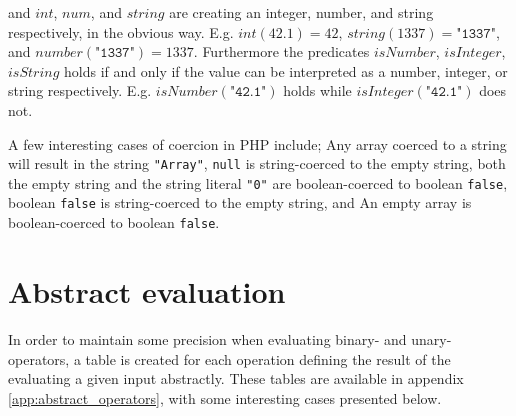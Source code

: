 and $\mathit{int}$, $\mathit{num}$, and $\mathit{string}$ are creating an integer, number, and string respectively, in the obvious way. E.g. $\mathit{int}(42.1) = 42$, $\mathit{string}(1337) = \texttt{"1337"}$, and $\mathit{number}(\texttt{"1337"}) = 1337$. Furthermore the predicates $\mathit{isNumber}$, $\mathit{isInteger}$, $\mathit{isString}$ holds if and only if the value can be interpreted as a number, integer, or string respectively. E.g. $\mathit{isNumber}(\texttt{"42.1"})$ holds while $\mathit{isInteger}(\texttt{"42.1"})$ does not.

A few interesting cases of coercion in PHP include; Any array coerced to a string will result in the string \texttt{"Array"}, \texttt{null} is string-coerced to the empty string, both the empty string and the string literal \texttt{"0"} are boolean-coerced to boolean \texttt{false}, boolean \texttt{false} is string-coerced to the empty string, and An empty array is boolean-coerced to boolean \texttt{false}.


\section{Abstract evaluation}
\label{sec:abseval}

In order to maintain some precision when evaluating binary- and unary-operators, a table is created for each operation defining the result of the evaluating a given input abstractly. These tables are available in appendix \ref{app:abstract_operators}, with some interesting cases presented below.


